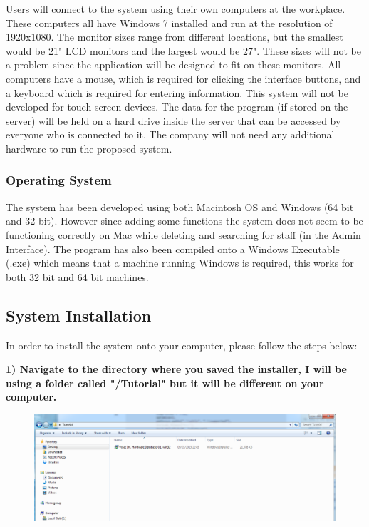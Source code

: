Users will connect to the system using their own computers at the workplace. These computers all have Windows 7 installed and run at the resolution of 1920x1080. The monitor sizes range from different locations, but the smallest would be 21" LCD monitors and the largest would be 27". These sizes will not be a problem since the application will be designed to fit on these monitors. All computers have a mouse, which is required for clicking the interface buttons, and a keyboard which is required for entering information. This system will not be developed for touch screen devices. The data for the program (if stored on the server) will be held on a hard drive inside the server that can be accessed by everyone who is connected to it. The company will not need any additional hardware to run the proposed system.

\subsubsection{Operating System}

The system has been developed using both Macintosh OS and Windows (64 bit and 32 bit). However since adding some functions the system does not seem to be functioning correctly on Mac while deleting and searching for staff (in the Admin Interface). The program has also been compiled onto a Windows Executable (.exe) which means that a machine running Windows is required, this works for both 32 bit and 64 bit machines.

\subsection{System Installation}\label{systeminstall}

In order to install the system onto your computer, please follow the steps below:

\textbf{1) Navigate to the directory where you saved the installer, I will be using a folder called "/Tutorial" but it will be different on your computer.}

\begin{figure}[H]
    \includegraphics[width=\textwidth]{./Manual/Images/Tut1.png}
\end{figure}

